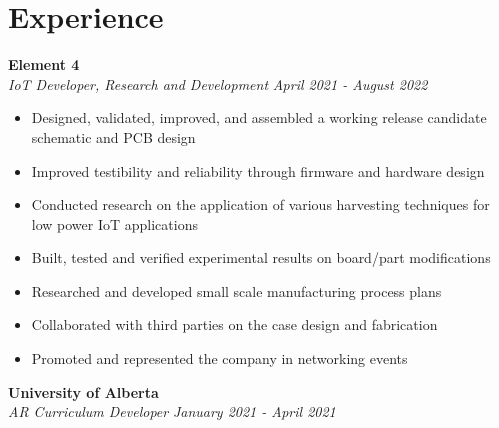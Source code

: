 \documentclass[a4paper,20pt]{article}
\begin{document}
\section{Experience}
    \vspace{-1pt}
        \textbf{Element 4}\hspace{13.5 cm}
        \textit{}\\
        \textit{IoT Developer, Research and Development} \hspace{7.8 cm}
        \textit{April 2021 - August 2022} \\
        \vspace{-18pt} 
        \hspace{-1pt}

    \begin{itemize}
        \item Designed, validated, improved, and assembled a working release candidate schematic and PCB design \vspace{-5pt}
        \item  Improved testibility and reliability through firmware and hardware design \vspace{-5pt}
        \item Conducted research on the application of various harvesting techniques for low power IoT applications \vspace{-5pt}
        \item Built, tested and verified experimental results on board/part modifications  \vspace{-5pt}
        \item Researched and developed small scale manufacturing process plans \vspace{-5pt}
        \item Collaborated with third parties on the case design and fabrication \vspace{-5pt}
        \item Promoted and represented the company in networking events 
    \end{itemize}
    \vspace{-1pt}
        \textbf{University of Alberta}\hspace{3cm}
        \textit{}\\
        \textit{AR Curriculum Developer}\hspace{10.05 cm}
        \textit{January 2021 - April 2021} \\
\end{document}

